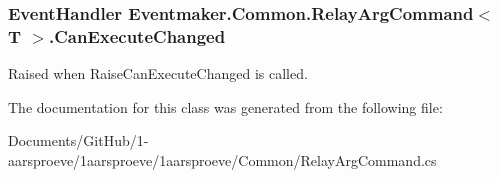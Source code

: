 \subsubsection[{Can\+Execute\+Changed}]{\setlength{\rightskip}{0pt plus 5cm}Event\+Handler {\bf Eventmaker.\+Common.\+Relay\+Arg\+Command}$<$ T $>$.Can\+Execute\+Changed}\label{class_eventmaker_1_1_common_1_1_relay_arg_command_a1f0e84b52325f50a02c9fe63ca5ee7ae}


Raised when Raise\+Can\+Execute\+Changed is called. 



The documentation for this class was generated from the following file\+:\begin{DoxyCompactItemize}
\item 
Documents/\+Git\+Hub/1-\/aarsproeve/1aarsproeve/1aarsproeve/\+Common/Relay\+Arg\+Command.\+cs\end{DoxyCompactItemize}

